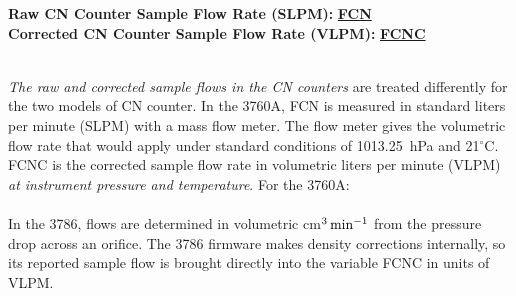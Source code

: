 \begin{hangparagraphs}
\textbf{}%
\noindent\begin{minipage}[t]{1\columnwidth}%
\textbf{Raw CN Counter Sample Flow Rate (SLPM):}\textbf{
}\textbf{\uline{FCN}}\\
\textbf{Corrected CN Counter Sample Flow Rate (VLPM):}\textbf{
}\textbf{\uline{FCNC}}\textbf{\uline{}}%
\end{minipage}\\
\emph{The raw and corrected sample flows in the CN counters} are treated
differently for the two models of CN counter. In the 3760A, FCN is
measured in standard liters per minute (SLPM) with a mass flow meter.
The flow meter gives the volumetric flow rate that would apply under
standard conditions of 1013.25~hPa and 21$^{\circ}$C.
FCNC is the corrected sample flow rate in volumetric liters per minute
(VLPM) \emph{at instrument pressure and temperature}. For the 3760A:\\
\\
In the 3786, flows are determined in volumetric cm$^{3}\thinspace\mathrm{min}^{-1}$
from the pressure drop across an orifice. The 3786 firmware makes
density corrections internally, so its reported sample flow is brought
directly into the variable FCNC in units of VLPM.\\
\vfill\eject


\end{hangparagraphs}
